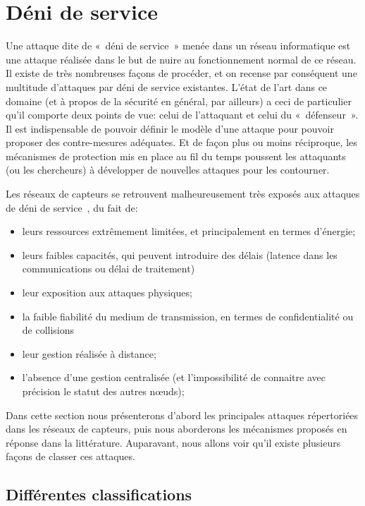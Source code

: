 \section{Déni de service}\label{ea:sec:dos}

Une attaque dite de « déni de service » menée dans un réseau informatique est une attaque réalisée dans le but de nuire au fonctionnement normal de ce réseau.
Il existe de très nombreuses façons de procéder, et on recense par conséquent une multitude d'attaques par déni de service existantes.
L'état de l'art dans ce domaine (et à propos de la sécurité en général, par ailleurs) a ceci de particulier qu'il comporte deux points de vue: celui de l'attaquant et celui du « défenseur ».
Il est indispensable de pouvoir définir le modèle d'une attaque pour pouvoir proposer des contre-mesures adéquates.
Et de façon plus ou moins réciproque, les mécanismes de protection mis en place au fil du temps poussent les attaquants (ou les chercheurs) à développer de nouvelles attaques pour les contourner.

Les réseaux de capteurs se retrouvent malheureusement très exposés aux attaques de déni de service~\cite{RM11}, du fait de:
\begin{itemize}
    \item leurs ressources extrêmement limitées, et principalement en termes d'énergie;
    \item leurs faibles capacités, qui peuvent introduire des délais (latence dans les communications ou délai de traitement)
    \item leur exposition aux attaques physiques;
    \item la faible fiabilité du medium de transmission, en termes de confidentialité ou de collisions
    \item leur gestion réalisée à distance;
    \item l'absence d'une gestion centralisée (et l'impossibilité de connaitre avec précision le statut des autres nœuds);
\end{itemize}

Dans cette section nous présenterons d'abord les principales attaques répertoriées dans les réseaux de capteurs, puis nous aborderons les mécanismes proposés en réponse dans la littérature.
Auparavant, nous allons voir qu'il existe plusieurs façons de classer ces attaques.

\subsection{Différentes classifications}

